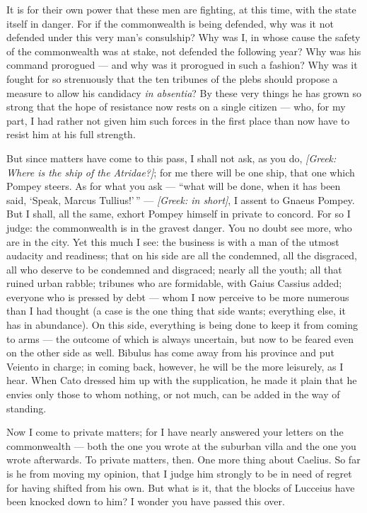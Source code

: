  It is for their own power that these men are fighting, at this time, with the state itself in danger. For if the commonwealth is being defended, why was it not defended under this very man's consulship? Why was I, in whose cause the safety of the commonwealth was at stake, not defended the following year? Why was his command prorogued --- and why was it prorogued in such a fashion? Why was it fought for so strenuously that the ten tribunes of the plebs should propose a measure to allow his candidacy \emph{in absentia}? By these very things he has grown so strong that the hope of resistance now rests on a single citizen --- who, for my part, I had rather not given him such forces in the first place than now have to resist him at his full strength.

 But since matters have come to this pass, I shall not ask, as you do, \textit{[Greek: Where is the ship of the Atridae?]}; for me there will be one ship, that one which Pompey steers. As for what you ask --- ``what will be done, when it has been said, `Speak, Marcus Tullius!'\,'' --- \textit{[Greek: in short]}, I assent to Gnaeus Pompey. But I shall, all the same, exhort Pompey himself in private to concord. For so I judge: the commonwealth is in the gravest danger. You no doubt see more, who are in the city. Yet this much I see: the business is with a man of the utmost audacity and readiness; that on his side are all the condemned, all the disgraced, all who deserve to be condemned and disgraced; nearly all the youth; all that ruined urban rabble; tribunes who are formidable, with Gaius Cassius added; everyone who is pressed by debt --- whom I now perceive to be more numerous than I had thought (a case is the one thing that side wants; everything else, it has in abundance). On this side, everything is being done to keep it from coming to arms --- the outcome of which is always uncertain, but now to be feared even on the other side as well. Bibulus has come away from his province and put Veiento in charge; in coming back, however, he will be the more leisurely, as I hear. When Cato dressed him up with the supplication, he made it plain that he envies only those to whom nothing, or not much, can be added in the way of standing.

 Now I come to private matters; for I have nearly answered your letters on the commonwealth --- both the one you wrote at the suburban villa and the one you wrote afterwards. To private matters, then. One more thing about Caelius. So far is he from moving my opinion, that I judge him strongly to be in need of regret for having shifted from his own. But what is it, that the blocks of Lucceius have been knocked down to him? I wonder you have passed this over.

